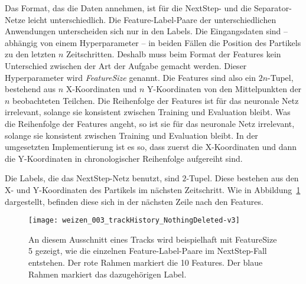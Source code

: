 Das Format, das die Daten annehmen, ist für die NextStep- und die Separator-Netze leicht unterschiedlich.
Die Feature-Label-Paare der unterschiedlichen Anwendungen unterscheiden sich nur in den Labels.
Die Eingangsdaten sind -- abhängig von einem Hyperparameter --
in beiden Fällen die Position des Partikels zu den letzten \(n\) Zeitschritten.
Deshalb muss beim Format der Features kein Unterschied zwischen der Art der Aufgabe gemacht werden.
Dieser Hyperparameter wird \textit{FeatureSize} genannt. 
Die Features sind also ein \(2n\)-Tupel, bestehend aus \(n\) X-Koordinaten und \(n\) Y-Koordinaten 
von den Mittelpunkten der \(n\) beobachteten Teilchen.
Die Reihenfolge der Features ist für das neuronale Netz irrelevant, solange sie konsistent zwischen Training und Evaluation bleibt.
Was die Reihenfolge der Features angeht, so ist sie für das neuronale Netz irrelevant, 
solange sie konsistent zwischen Training und Evaluation bleibt. 
In der umgesetzten Implementierung ist es so, dass zuerst die X-Koordinaten 
und dann die Y-Koordinaten in chronologischer Reihenfolge aufgereiht sind. 



Die Labels, die das NextStep-Netz benutzt, sind \(2\)-Tupel.
Diese bestehen aus den X- und Y-Koordinaten des Partikels im nächsten Zeitschritt.
Wie in Abbildung~\ref{fig:FLPNext} dargestellt, befinden diese sich in der nächsten Zeile nach den Features.

\begin{figure}
	\centering
	\texttt{[image: weizen\_003\_trackHistory\_NothingDeleted-v3]}
	\caption[Beispiel Feature-Label-Paar NextStep]{An diesem Ausschnitt eines Tracks wird beispielhaft mit FeatureSize 5 gezeigt, wie die einzelnen Feature-Label-Paare im NextStep-Fall entstehen.
		Der rote Rahmen markiert die 10 Features. Der blaue Rahmen markiert das dazugehörigen Label. 
		}
	\label{fig:FLPNext}
\end{figure}


